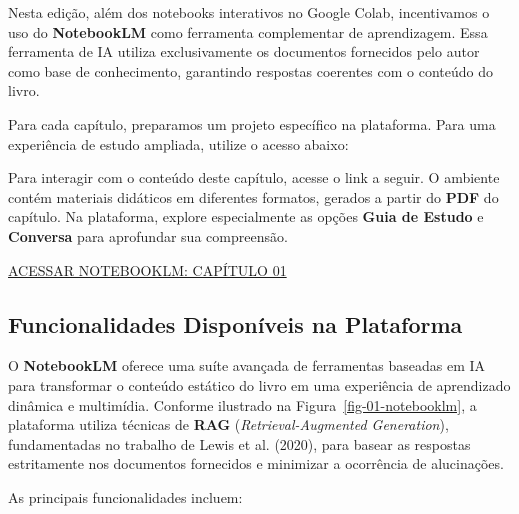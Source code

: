 \documentclass[
  portuguese,
  letterpaper,
  openany,
  oneside,
  12pt,
  a4paper]{book}
\begin{document}
Nesta edição, além dos notebooks interativos no Google Colab,
incentivamos o uso do \textbf{NotebookLM} como ferramenta complementar
de aprendizagem. Essa ferramenta de IA utiliza exclusivamente os
documentos fornecidos pelo autor como base de conhecimento, garantindo
respostas coerentes com o conteúdo do livro.

Para cada capítulo, preparamos um projeto específico na plataforma. Para
uma experiência de estudo ampliada, utilize o acesso abaixo:

\begin{tcolorbox}[enhanced jigsaw, coltitle=black, colback=white, colbacktitle=quarto-callout-important-color!10!white, bottomtitle=1mm, left=2mm, opacityback=0, breakable, rightrule=.15mm, titlerule=0mm, toptitle=1mm, opacitybacktitle=0.6, title={\emoji{graduation-cap} Estude com o Tutor Inteligente}, colframe=quarto-callout-important-color-frame, arc=.35mm, bottomrule=.15mm, toprule=.15mm, leftrule=.75mm]

Para interagir com o conteúdo deste capítulo, acesse o link a seguir. O
ambiente contém materiais didáticos em diferentes formatos, gerados a
partir do \textbf{PDF} do capítulo. Na plataforma, explore especialmente
as opções \textbf{Guia de Estudo} e \textbf{Conversa} para aprofundar
sua compreensão.

\href{https://notebooklm.google.com/notebook/aca1138a-02aa-4f98-b777-1e25795ca635}{
ACESSAR NOTEBOOKLM: CAPÍTULO 01}

\end{tcolorbox}

\subsection*{Funcionalidades Disponíveis na
Plataforma}\label{funcionalidades-disponuxedveis-na-plataforma}

O \textbf{NotebookLM} oferece uma suíte avançada de ferramentas baseadas
em IA para transformar o conteúdo estático do livro em uma experiência
de aprendizado dinâmica e multimídia. Conforme ilustrado na
Figura~\ref{fig-01-notebooklm}, a plataforma utiliza técnicas de
\textbf{RAG} (\emph{Retrieval-Augmented Generation}), fundamentadas no
trabalho de Lewis et al. (2020), para basear as respostas estritamente
nos documentos fornecidos e minimizar a ocorrência de alucinações.

As principais funcionalidades incluem:
\end{document}

